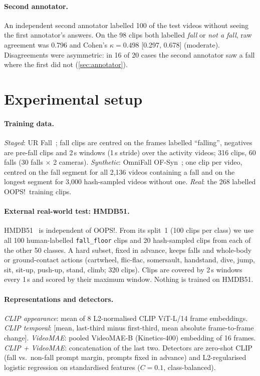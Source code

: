 \documentclass[10pt,twocolumn,letterpaper]{article}
\begin{document}
\paragraph{Second annotator.} An independent second annotator labelled 100 of the test videos without seeing the first annotator's answers. On the 98 clips both labelled \emph{fall} or \emph{not a fall}, raw agreement was 0.796 and Cohen's $\kappa=0.498$ [0.297, 0.678] (moderate). Disagreements were asymmetric: in 16 of 20 cases the second annotator saw a fall where the first did not (\cref{sec:annotator}).

\section{Experimental setup}\label{sec:setup}
\paragraph{Training data.} \emph{Staged}: UR Fall~\cite{kwolek2014}; fall clips are centred on the frames labelled ``falling'', negatives are pre-fall clips and 2\,s windows (1\,s stride) over the activity videos; 316 clips, 60 falls (30 falls $\times$ 2 cameras). \emph{Synthetic}: OmniFall OF-Syn~\cite{omnifall}; one clip per video, centred on the fall segment for all 2,136 videos containing a fall and on the longest segment for 3,000 hash-sampled videos without one. \emph{Real}: the 268 labelled OOPS!\ training clips.

\paragraph{External real-world test: HMDB51.} HMDB51~\cite{kuehne2011hmdb} is independent of OOPS!. From its split~1 (100 clips per class) we use all 100 human-labelled \texttt{fall\_floor} clips and 20 hash-sampled clips from each of the other 50 classes. A hard subset, fixed in advance, keeps falls and whole-body or ground-contact actions (cartwheel, flic-flac, somersault, handstand, dive, jump, sit, sit-up, push-up, stand, climb; 320 clips). Clips are covered by 2\,s windows every 1\,s and scored by their maximum window. Nothing is trained on HMDB51.

\paragraph{Representations and detectors.} \emph{CLIP appearance}: mean of 8 L2-normalised CLIP ViT-L/14 frame embeddings. \emph{CLIP temporal}: [mean, last-third minus first-third, mean absolute frame-to-frame change]. \emph{VideoMAE}: pooled VideoMAE-B (Kinetics-400) embedding of 16 frames. \emph{CLIP + VideoMAE}: concatenation of the last two. Detectors are zero-shot CLIP (fall vs.\ non-fall prompt margin, prompts fixed in advance) and L2-regularised logistic regression on standardised features ($C=0.1$, class-balanced).
\end{document}
